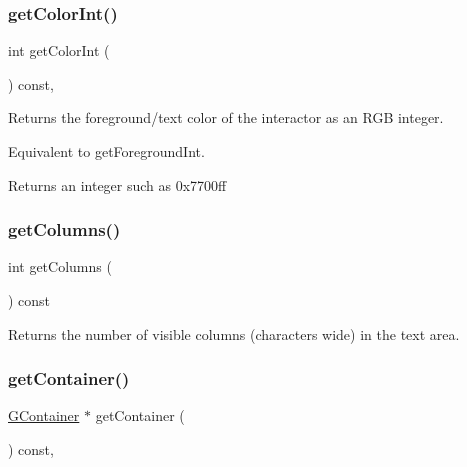 \subsubsection{\texorpdfstring{get\+Color\+Int()}{getColorInt()}}
{\footnotesize\ttfamily int get\+Color\+Int (\begin{DoxyParamCaption}{ }\end{DoxyParamCaption}) const\hspace{0.3cm}{\ttfamily [virtual]}, {\ttfamily [inherited]}}



Returns the foreground/text color of the interactor as an R\+GB integer. 

Equivalent to get\+Foreground\+Int. \begin{DoxyReturn}{Returns}
an integer such as 0x7700ff 
\end{DoxyReturn}
\mbox{\label{classGTextArea_a6b5395e749ae5c217093d74f68f1ca3a}} 
\subsubsection{\texorpdfstring{get\+Columns()}{getColumns()}}
{\footnotesize\ttfamily int get\+Columns (\begin{DoxyParamCaption}{ }\end{DoxyParamCaption}) const\hspace{0.3cm}{\ttfamily [virtual]}}



Returns the number of visible columns (characters wide) in the text area. 

\mbox{\label{classGInteractor_a7a6e317c29d61030929b4cd2d1c00fe7}} 
\subsubsection{\texorpdfstring{get\+Container()}{getContainer()}}
{\footnotesize\ttfamily \mbox{\hyperlink{classGContainer}{G\+Container}} $\ast$ get\+Container (\begin{DoxyParamCaption}{ }\end{DoxyParamCaption}) const\hspace{0.3cm}{\ttfamily [virtual]}, {\ttfamily [inherited]}}



